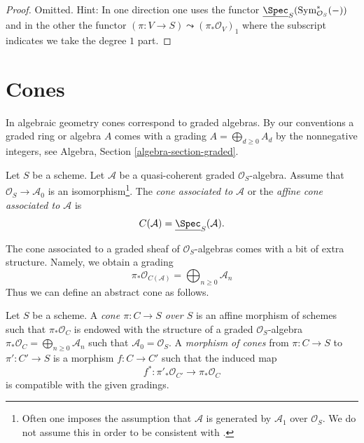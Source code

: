 \begin{proof}
Omitted. Hint: In one direction one uses the functor
$\underline{\Spec}_S(\text{Sym}^*_{\mathcal{O}_S}(-))$
and in the other the functor
$(\pi : V \to S) \leadsto (\pi_*\mathcal{O}_V)_1$ where the subscript
indicates we take the degree $1$ part.
\end{proof}




\section{Cones}
\label{section-cone}

\noindent
In algebraic geometry cones correspond to graded algebras. By our conventions
a graded ring or algebra $A$ comes with a grading
$A = \bigoplus_{d \geq 0} A_d$ by the nonnegative integers, see
Algebra, Section \ref{algebra-section-graded}.

\begin{definition}
\label{definition-cone}
Let $S$ be a scheme. Let $\mathcal{A}$ be a quasi-coherent
graded $\mathcal{O}_S$-algebra. Assume that $\mathcal{O}_S \to \mathcal{A}_0$
is an isomorphism\footnote{Often one imposes the assumption that
$\mathcal{A}$ is generated by $\mathcal{A}_1$ over $\mathcal{O}_S$. We do not
assume this in order to be consistent with \cite[II, (8.3.1)]{EGA}.}.
The {\it cone associated to $\mathcal{A}$} or the
{\it affine cone associated to $\mathcal{A}$}
is
$$
C(\mathcal{A}) = \underline{\Spec}_S(\mathcal{A}).
$$
\end{definition}

\noindent
The cone associated to a graded sheaf of $\mathcal{O}_S$-algebras
comes with a bit of extra structure. Namely, we obtain a grading
$$
\pi_*\mathcal{O}_{C(\mathcal{A})} =
\bigoplus\nolimits_{n \geq 0} \mathcal{A}_n
$$
Thus we can define an abstract cone as follows.

\begin{definition}
\label{definition-abstract-cone}
Let $S$ be a scheme. A {\it cone $\pi : C \to S$ over $S$} is an
affine morphism of schemes such that $\pi_*\mathcal{O}_C$ is endowed with
the structure of a graded $\mathcal{O}_S$-algebra
$\pi_*\mathcal{O}_C = \bigoplus\nolimits_{n \geq 0} \mathcal{A}_n$
such that $\mathcal{A}_0 = \mathcal{O}_S$. A {\it morphism of cones}
from $\pi : C \to S$ to $\pi' : C' \to S$
is a morphism $f : C \to C'$ such that the induced map
$$
f^* : \pi'_*\mathcal{O}_{C'} \longrightarrow \pi_*\mathcal{O}_C
$$
is compatible with the given gradings.
\end{definition}

